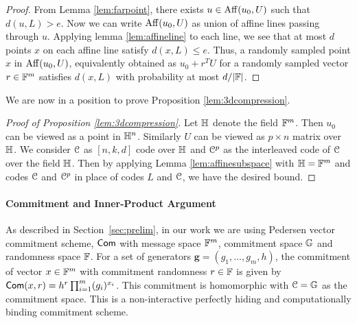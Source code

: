 \begin{proof}
	From Lemma \ref{lem:farpoint}, there exists $u\in {\rm Aff}({u_0},{U})$ such that $d(u,L)>e$. Now we can write ${\rm Aff}({u_0},{U})$ as union of affine lines passing through $u$. Applying lemma \ref{lem:affineline} to each line, we see that at most $d$ points $x$ on each affine line satisfy $d(x,L)\leq e$. Thus, a randomly sampled point $x$ in ${\rm Aff}({u_0},{U})$, equivalently obtained as $u_0+r^TU$ for a randomly sampled vector $r\in \mathbb{F}^m$ satisfies $d(x,L)$ with probability at most $d/|\mathbb{F}|$.
\end{proof}
We are now in a position to prove Proposition \ref{lem:3dcompression}.
\begin{proof}[Proof of Proposition \ref{lem:3dcompression}]
	Let $\mathbb{H}$ denote the field $\mathbb{F}^m$. Then $u_0$ can be viewed as a point in
	$\mathbb{H}^n$. Similarly $U$ can be viewed as $p\times n$ matrix over $\mathbb{H}$.
	We consider $\mathcal{C}$ as $[n,k,d]$ code over $\mathbb{H}$ and $\mathcal{C}^p$ as the
	interleaved code of $\mathcal{C}$ over the field $\mathbb{H}$. Then by applying Lemma \ref{lem:affinesubspace}
	with $\mathbb{H}=\mathbb{F}^m$ and codes $\mathcal{C}$ and $\mathcal{C}^p$ in place of codes $L$ and	$\mathcal{C}$, we have the desired bound.
\end{proof}

\paragraph*{Commitment and Inner-Product Argument}
As described in Section~\ref{sec:prelim}, in our work we are using Pedersen vector commitment scheme, $\mathsf{Com}$ with message space $\mathbb{F}^m$, commitment space $\mathbb{G}$ and randomness space $\mathbb{F}$. For a set of generators $\bm{g}=(g_1,\ldots,g_m,h)$, the commitment of vector $x\in \mathbb{F}^m$ with commitment randomness $r\in \mathbb{F}$ is given by $\mathsf{Com}(x,r)=h^r \prod_{i=1}^m (g_i)^{x_i} $. This commitment is homomorphic with $\mathcal{C}=\mathbb{G}$ as the commitment space. This is a non-interactive perfectly hiding and computationally binding commitment scheme.

